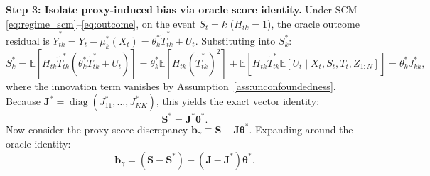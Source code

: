 \documentclass[twoside]{article}
\theoremstyle{definition}
\newcommand{\E}{\mathbb{E}}
\begin{document}
\textbf{Step 3: Isolate proxy-induced bias via oracle score identity.}
Under SCM \eqref{eq:regime_scm}--\eqref{eq:outcome}, on the event $S_t = k$ ($H_{tk} = 1$), the oracle outcome residual is $\tilde{Y}_{tk}^* = Y_t - \mu_k^*(X_t) = \theta_k^* \tilde{T}_{tk}^* + U_t$.
Substituting into $S_k^*$:
\begin{equation}
    S_k^* = \E\left[ H_{tk} \tilde{T}_{tk}^* (\theta_k^* \tilde{T}_{tk}^* + U_t) \right] = \theta_k^* \E[H_{tk} (\tilde{T}_{tk}^*)^2] + \E\left[ H_{tk} \tilde{T}_{tk}^* \E[U_t \mid X_t, S_t, T_t, Z_{1:N}] \right] = \theta_k^* J_{kk}^*,
\end{equation}
where the innovation term vanishes by Assumption~\ref{ass:unconfoundedness}. Because $\boldsymbol{J}^* = \operatorname{diag}(J_{11}^*, \dots, J_{KK}^*)$, this yields the exact vector identity:
\begin{equation}
    \boldsymbol{S}^* = \boldsymbol{J}^* \boldsymbol{\theta}^*.
\end{equation}
Now consider the proxy score discrepancy $\boldsymbol{b}_\gamma \equiv \boldsymbol{S} - \boldsymbol{J}\boldsymbol{\theta}^*$. Expanding around the oracle identity:
\begin{equation}
    \boldsymbol{b}_\gamma = (\boldsymbol{S} - \boldsymbol{S}^*) - (\boldsymbol{J} - \boldsymbol{J}^*) \boldsymbol{\theta}^*.
\end{equation}
\end{document}
